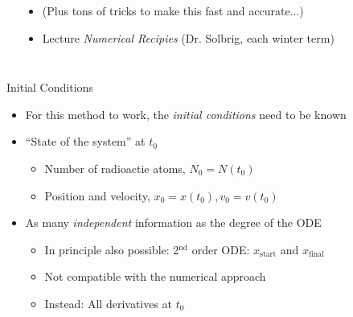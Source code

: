 \begin{frame}[fragile]
\begin{columns}[t]
\begin{center}
\end{center}
\begin{itemize}
\item (Plus tons of tricks to make this fast and accurate...)
\item[\Thus] Lecture \emph{Numerical Recipies} (Dr. Solbrig, each winter term)
\end{itemize}
\end{columns}
%
\end{frame}


\begin{frame}{Initial Conditions}
%
\begin{itemize}
\item For this method to work, the \emph{initial conditions} need to be known
\item \enquote{State of the system} at $t_0$
	\begin{itemize}
	\item Number of radioactie atoms, $N_0 = N(t_0)$
	\item Position and velocity, $x_0 = x(t_0), v_0 = v(t_0)$
	\end{itemize}
\item As many \emph{independent} information as the degree of the ODE
	\begin{itemize}
	\item In principle also possible: 2$^{\text{nd}}$ order ODE: $x_{\text{start}}$ and $x_{\text{final}}$
	\item Not compatible with the numerical approach
	\item Instead: All derivatives at $t_0$
	\end{itemize}
\end{itemize}
%
\end{frame}


